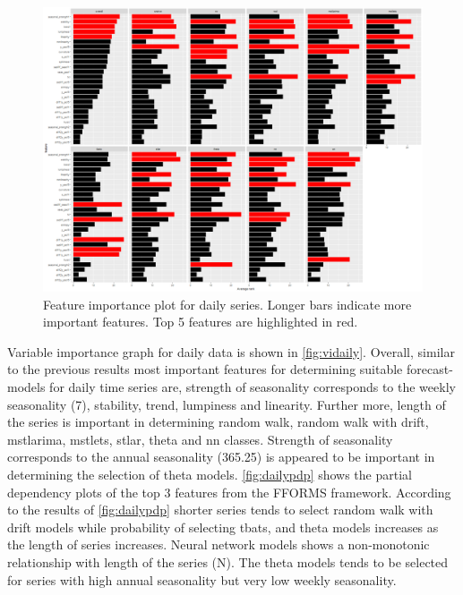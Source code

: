 \documentclass[11pt,a4paper,]{article}
\theoremstyle{definition}
\theoremstyle{definition}
\theoremstyle{definition}
\theoremstyle{remark}
\begin{document}
\begin{figure}[h]

{\centering \includegraphics{figures/vidaily-1} 

}

\caption{Feature importance plot for daily series. Longer bars indicate more important features. Top 5 features are highlighted in red.}\label{fig:vidaily}
\end{figure}

Variable importance graph for daily data is shown in
\autoref{fig:vidaily}. Overall, similar to the previous results most
important features for determining suitable forecast-models for daily
time series are, strength of seasonality corresponds to the weekly
seasonality (7), stability, trend, lumpiness and linearity. Further
more, length of the series is important in determining random walk,
random walk with drift, mstlarima, mstlets, stlar, theta and nn classes.
Strength of seasonality corresponds to the annual seasonality (365.25)
is appeared to be important in determining the selection of theta
models. \autoref{fig:dailypdp} shows the partial dependency plots of the
top 3 features from the FFORMS framework. According to the results of
\autoref{fig:dailypdp} shorter series tends to select random walk with
drift models while probability of selecting tbats, and theta models
increases as the length of series increases. Neural network models shows
a non-monotonic relationship with length of the series (N). The theta
models tends to be selected for series with high annual seasonality but
very low weekly seasonality.

\newpage
\end{document}
